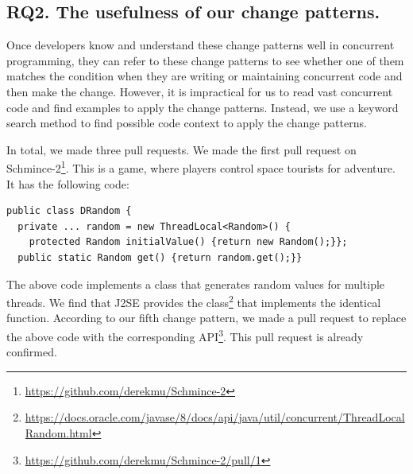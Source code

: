 \subsection{RQ2. The usefulness of our change patterns.}
\label{sec:result:sample}


Once developers know and understand these change patterns well in concurrent programming, they can refer to these change patterns to see whether one of them matches the condition when they are writing or maintaining concurrent code and then make the change. However, it is impractical for us to read vast concurrent code and find examples to apply the change patterns. Instead, we use a keyword search method to find possible code context to apply the change patterns.

In total, we made three pull requests. We made the first pull request on Schmince-2\footnote{\url{https://github.com/derekmu/Schmince-2}}. This is a game, where players control space tourists for adventure. It has the following code:

\begin{lstlisting}
public class DRandom {
  private ... random = new ThreadLocal<Random>() {
    protected Random initialValue() {return new Random();}};
  public static Random get() {return random.get();}}
\end{lstlisting}

The above code implements a class that generates random values for multiple threads. We find that J2SE provides the  class\footnote{\url{https://docs.oracle.com/javase/8/docs/api/java/util/concurrent/ThreadLocalRandom.html}} that implements the identical function. According to our fifth change pattern, we made a pull request to replace the above code with the corresponding API\footnote{\url{https://github.com/derekmu/Schmince-2/pull/1}}. This pull request is already confirmed.


